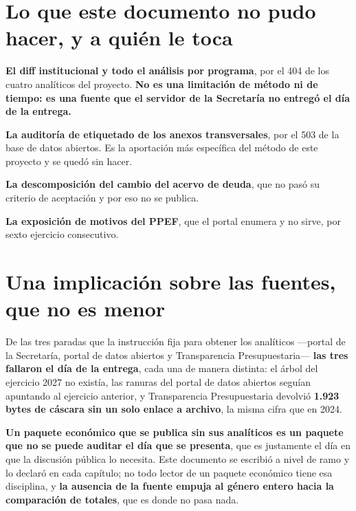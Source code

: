 \section{Lo que este documento no pudo hacer, y a quién le toca}

\begin{list}{}{\setlength{\leftmargin}{1.4em}\setlength{\itemsep}{2pt}}
\item[$\bullet$] \textbf{El diff institucional y todo el análisis por programa}, por el 404 de
los cuatro analíticos del proyecto. \textbf{No es una limitación de método ni de tiempo: es
una fuente que el servidor de la Secretaría no entregó el día de la entrega.}
\item[$\bullet$] \textbf{La auditoría de etiquetado de los anexos transversales}, por el 503
de la base de datos abiertos. Es la aportación más específica del método de este proyecto y
se quedó sin hacer.
\item[$\bullet$] \textbf{La descomposición del cambio del acervo de deuda}, que no pasó su
criterio de aceptación y por eso no se publica.
\item[$\bullet$] \textbf{La exposición de motivos del PPEF}, que el portal enumera y no
sirve, por sexto ejercicio consecutivo.
\end{list}

\section{Una implicación sobre las fuentes, que no es menor}

De las tres paradas que la instrucción fija para obtener los analíticos ---portal de la
Secretaría, portal de datos abiertos y Transparencia Presupuestaria--- \textbf{las tres
fallaron el día de la entrega}, cada una de manera distinta: el árbol del ejercicio 2027 no
existía, las ranuras del portal de datos abiertos seguían apuntando al ejercicio anterior, y
Transparencia Presupuestaria devolvió \textbf{1.923 bytes de cáscara sin un solo enlace a
archivo}, la misma cifra que en 2024.

\textbf{Un paquete económico que se publica sin sus analíticos es un paquete que no se puede
auditar el día que se presenta}, que es justamente el día en que la discusión pública lo
necesita. Este documento se escribió a nivel de ramo y lo declaró en cada capítulo; no todo
lector de un paquete económico tiene esa disciplina, y \textbf{la ausencia de la fuente
empuja al género entero hacia la comparación de totales}, que es donde no pasa nada.

